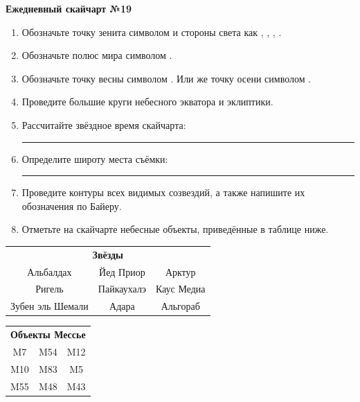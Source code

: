 \documentclass{./SAS-class-skygen}
\begin{document}
    
    
    
	\begin{center}
		\large\textbf{Ежедневный скайчарт №19}
	\end{center}

	\begin{enumerate}
		\item Обозначьте точку зенита символом  и стороны света как , , , .
		\item Обозначьте полюс мира символом .
		\item Обозначьте точку весны символом \Aries. Или же точку осени символом \Libra.
		\item Проведите большие круги небесного экватора и эклиптики.
		\item Рассчитайте звёздное время скайчарта: \rule{2cm}{0.4pt}
		\item Определите широту места съёмки: \rule{2cm}{0.4pt}
		\item Проведите контуры всех видимых созвездий, а также напишите их обозначения по Байеру.
		\item Отметьте на скайчарте небесные объекты, приведённые в таблице ниже.
	\end{enumerate}
	
    \vspace{0.5cm}

    \begin{table}[h!]
    \centering
    \begin{tabular}{ccc}
    \multicolumn{3}{c}{\textbf{Звёзды}} \\ Альбалдах & Йед Приор & Арктур \\
Ригель & Пайкаухалэ & Каус Медиа \\
Зубен эль Шемали & Адара & Альгораб \\

\end{tabular}
    \hfill
    \begin{tabular}{ccc}
    \multicolumn{3}{c}{\textbf{Объекты Мессье}} \\ M7 & M54 & M12 \\
M10 & M83 & M5 \\
M55 & M48 & M43 \\

\end{tabular}
    \end{table}
	
\end{document}
